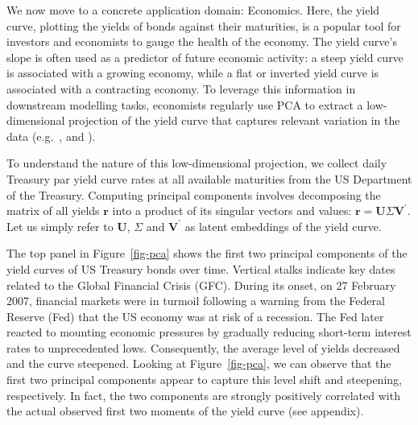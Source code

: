 \documentclass{article}
\theoremstyle{plain}
\theoremstyle{definition}
\theoremstyle{remark}
\begin{document}
We now move to a concrete application domain: Economics. Here, the yield curve, plotting the yields of bonds against their maturities, is a popular tool for investors and economists to gauge the health of the economy.
The yield curve's slope is often used as a predictor of future economic activity: a steep yield curve is associated with a growing economy, while a flat or inverted yield curve is associated with a contracting economy. %
To leverage this information in downstream modelling tasks, economists regularly use PCA to extract a low-dimensional projection of the yield curve that captures relevant variation in the data (e.g.\ \citet{berardi2022dissecting}, \citet{kumar2022effective} and \citet{crump2019deconstructing}).

To understand the nature of this low-dimensional projection, we collect daily Treasury par yield curve rates at all available maturities from the US Department of the Treasury. Computing principal components involves decomposing the matrix of all yields \(\mathbf{r}\) into a product of its singular vectors and values: \(\mathbf{r}=\mathbf{U}\Sigma\mathbf{V}^{\prime}\). Let us simply refer to \(\mathbf{U}\), \(\Sigma\) and \(\mathbf{V}^{\prime}\) as latent embeddings of the yield curve.

The top panel in Figure~\ref{fig-pca} shows the first two principal components of the yield curves of US Treasury bonds over time. Vertical stalks indicate key dates related to the Global Financial Crisis (GFC). During its onset, on 27 February 2007, financial markets were in turmoil following a warning from the Federal Reserve (Fed) that the US economy was at risk of a recession. The Fed later reacted to mounting economic pressures by gradually reducing short-term interest rates to unprecedented lows. Consequently, the average level of yields decreased and the curve steepened. Looking at Figure~\ref{fig-pca}, we can observe that the first two principal components appear to capture this level shift and steepening, respectively. In fact, the two components are strongly positively correlated with the actual observed first two moments of the yield curve (see appendix).
\end{document}

